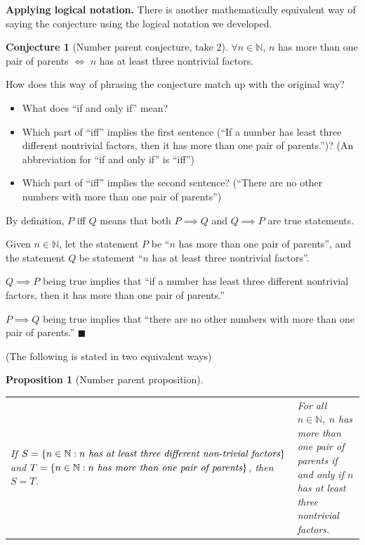 \documentclass[11pt]{article}
\newenvironment{task}
	{\begin{mdframed}[linecolor=lightgray, linewidth=3pt]\raggedright}
	{\end{mdframed}}
\newcommand\tn{\textnormal}
\newcommand{\N}{\mathbb{N}}
\newcommand\st{:}
\newtheorem{proposition}[theorem]{Proposition}
\theoremstyle{definition}
\newtheorem{conjecture}[theorem]{Conjecture}
\newenvironment{solution}{{\it Solution.} }{\hfill {\color{lightgray}$\blacksquare$}}
\begin{document}
\bigskip
{\bf Applying logical notation.} There is another mathematically equivalent way of saying the conjecture using the logical notation we developed. 

\begin{conjecture}[Number parent conjecture, take 2]\label{c: number parent 2}
$\forall n\in \N$, $n$ has more than one pair of parents $\iff$ $n$ has at least three nontrivial factors.
\end{conjecture}

\begin{task}
How does this way of phrasing the conjecture match up with the original way? 
	\begin{itemize}
	\item What does ``if and only if'' mean? 
	\item Which part of ``iff'' implies the first sentence (``If a number has least three different nontrivial factors, then it has more than one pair of parents.'')?   (An abbreviation for ``if and only if'' is ``iff'')
	\item Which part of ``iff'' implies the second sentence? (``There are no other numbers with more than one pair of parents'') 
	\end{itemize}
\end{task}


\begin{solution}
By definition, $P$ iff $Q$ means that both $P\implies Q$ and $Q\implies P$ are true statements.

Given $n\in \N$, let the statement $P$ be ``$n$ has more than one pair of parents'', and the statement $Q$ be statement ``$n$ has at least three nontrivial factors''.

$Q\implies P$ being true implies that ``if a number has least three different nontrivial factors, then it has more than one pair of parents.'' 

$P\implies Q$ being true implies that ``there are no other numbers with more than one pair of parents.'' 
\end{solution}

\bigskip


(The following is stated in two equivalent ways) 
\begin{proposition}[Number parent proposition]\label{p: number parent}
\hspace*{-6pt}\begin{tabular}{L{3.5in}|L{2.8in}}
If $S=\{ n\in \N\st n\tn{ \it has at least three different non-trivial factors}\}$ and $T=\{ n\in \N \st n \tn{ \it has more than one pair of parents}\}$, then $S=T$.
& 
For all $n\in \N$, $n$ has more than one pair of parents if and only if $n$ has at least three nontrivial factors.
\end{tabular}
\end{proposition}
\end{document}
